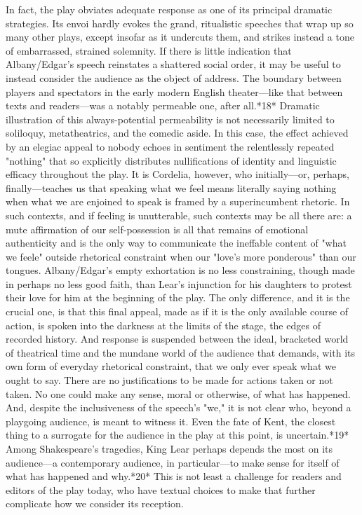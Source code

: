 	In fact, the play obviates adequate response as one of its principal dramatic strategies. Its envoi hardly evokes the grand, ritualistic speeches that wrap up so many other plays, except insofar as it undercuts them, and strikes instead a tone of embarrassed, strained solemnity. If there is little indication that Albany/Edgar's speech reinstates a shattered social order, it may be useful to instead consider the audience as the object of address. The boundary between players and spectators in the early modern English theater—like that between texts and readers—was a  notably permeable one, after all.*18* Dramatic illustration of this always-potential permeability is not necessarily limited to soliloquy, metatheatrics, and the comedic aside. In this case, the effect achieved by an elegiac appeal to nobody echoes in sentiment the relentlessly repeated "nothing" that so explicitly distributes nullifications of identity and linguistic efficacy throughout the play. It is Cordelia, however, who initially—or, perhaps, finally—teaches us that speaking what we feel means literally saying nothing when what we are enjoined to speak is framed by a superincumbent rhetoric. In such contexts, and if feeling is unutterable, such contexts may be all there are: a mute affirmation of our self-possession is all that remains of emotional authenticity and is the only way to communicate the ineffable content of "what we feele" outside rhetorical constraint when our "love's more ponderous" than our tongues. Albany/Edgar's empty exhortation is no less constraining, though made in perhaps no less good faith, than Lear's injunction for his daughters to protest their love for him at the beginning of the play. The only difference, and it is the crucial one, is that this final appeal, made as if it is the only available course of action, is spoken into the darkness at the limits of the stage, the edges of recorded history. And response is suspended between the ideal, bracketed world of theatrical time and the mundane world of the audience that demands, with its own form of everyday rhetorical constraint, that we only ever speak what we ought to say. There are no justifications to be made for actions taken or not taken. No one could make any sense, moral or otherwise, of what has happened. And, despite the inclusiveness of the speech's "we," it is not clear who, beyond a playgoing audience, is meant to witness it. Even the fate of Kent, the closest thing to a surrogate for the audience in the play at this point, is uncertain.*19* Among Shakespeare's tragedies, King Lear perhaps depends the most on its audience—a contemporary audience, in particular—to make sense for itself of what has happened and why.*20* This is not least a challenge for readers and editors of the play today, who have textual choices to make that further complicate how we consider its reception.

